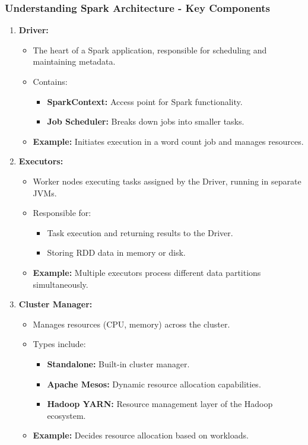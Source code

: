 \documentclass[aspectratio=169]{beamer}
\begin{document}
\begin{frame}[fragile]
    \frametitle{Understanding Spark Architecture - Key Components}
    \begin{enumerate}
        \item \textbf{Driver:}
        \begin{itemize}
            \item The heart of a Spark application, responsible for scheduling and maintaining metadata.
            \item Contains:
            \begin{itemize}
                \item \textbf{SparkContext:} Access point for Spark functionality.
                \item \textbf{Job Scheduler:} Breaks down jobs into smaller tasks.
            \end{itemize}
            \item \textbf{Example:} Initiates execution in a word count job and manages resources.
        \end{itemize}

        \item \textbf{Executors:}
        \begin{itemize}
            \item Worker nodes executing tasks assigned by the Driver, running in separate JVMs.
            \item Responsible for:
            \begin{itemize}
                \item Task execution and returning results to the Driver.
                \item Storing RDD data in memory or disk.
            \end{itemize}
            \item \textbf{Example:} Multiple executors process different data partitions simultaneously.
        \end{itemize}

        \item \textbf{Cluster Manager:}
        \begin{itemize}
            \item Manages resources (CPU, memory) across the cluster.
            \item Types include:
            \begin{itemize}
                \item \textbf{Standalone:} Built-in cluster manager.
                \item \textbf{Apache Mesos:} Dynamic resource allocation capabilities.
                \item \textbf{Hadoop YARN:} Resource management layer of the Hadoop ecosystem.
            \end{itemize}
            \item \textbf{Example:} Decides resource allocation based on workloads.
        \end{itemize}
    \end{enumerate}
\end{frame}
\end{document}
